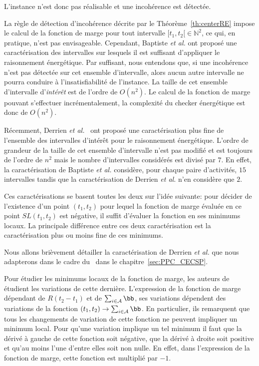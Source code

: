 \begin{ex}
L'instance n'est donc pas réalisable et une incohérence est détectée. 
\end{ex}

La règle de détection d'incohérence décrite par le
Théorème~\ref{th:centerRE} impose le calcul de la fonction de marge
pour tout intervalle $[t_1,t_2[ \in \mathbb{N}^2$, ce qui, en
pratique, n'est pas envisageable. Cependant, Baptiste {\it et al.} ont
proposé une caractérisation des intervalles sur lesquels il est
suffisant d'appliquer le raisonnement énergétique. Par suffisant, nous
entendons que, si une incohérence n'est pas détectée sur cet ensemble
d'intervalle, alors aucun autre intervalle ne pourra conduire à
l'insatisfiabilité de l'instance. La taille de cet ensemble
d'intervalle d'{\it intérêt} est de l'ordre de $O(n^2)$. Le calcul de
la fonction de marge pouvant s'effectuer incrémentalement, la
complexité du checker énergétique est donc de $O(n^2)$.

Récemment, Derrien {\it et al.}~\cite{DP} ont proposé une
caractérisation plus fine de l'ensemble des intervalles d'intérêt pour
le raisonnement énergétique. L'ordre de grandeur de la taille de cet
ensemble d'intervalle n'est pas modifié et est toujours de l'ordre de
$n^2$ mais le nombre d'intervalles considérés est divisé par $7$. En
effet, la caractérisation de Baptiste {\it et al.} considère, pour
chaque paire d'activités, $15$ intervalles tandis que la
caractérisation de Derrien {\it et al.} n'en considère que $2$.


Ces caractérisations se basent toutes les deux sur l'idée suivante:
pour décider de l'existence d'un point $(t_1,t_2)$ pour lequel la
fonction de marge évaluée en ce point $SL(t_1,t_2)$ est négative, il
suffit d'évaluer la fonction en ses minimums locaux. La principale
différence entre ces deux caractérisation est la caractérisation plus
ou moins fine de ces minimums.

Nous allons brièvement détailler la caractérisation de Derrien {\it et
al.} que nous adapterons dans le cadre du \CECSP~dans le
chapitre~\ref{sec:PPC_CECSP}.

Pour étudier les minimums locaux de la fonction de marge, les auteurs
de~\cite{DP} étudient les variations de cette dernière. L'expression
de la fonction de marge dépendant de $R(t_2-t_1)$ et de $\sum_{i \in
  \A} \bb$, ses variations dépendent des variations de la fonction
$(t_1,t_2) \rightarrow \sum_{i \in \A} \bb$. En particulier, ils
remarquent que tous les changements de variation de cette fonction ne
peuvent impliquer un minimum local. Pour qu'une variation implique un
tel minimum il faut que la dérivé à gauche de cette fonction soit
négative, que la dérivé à droite soit positive et qu'au moins l'une
d'entre elles soit non nulle. En effet, dans l'expression de la
fonction de marge, cette fonction est multiplié par $-1$.

